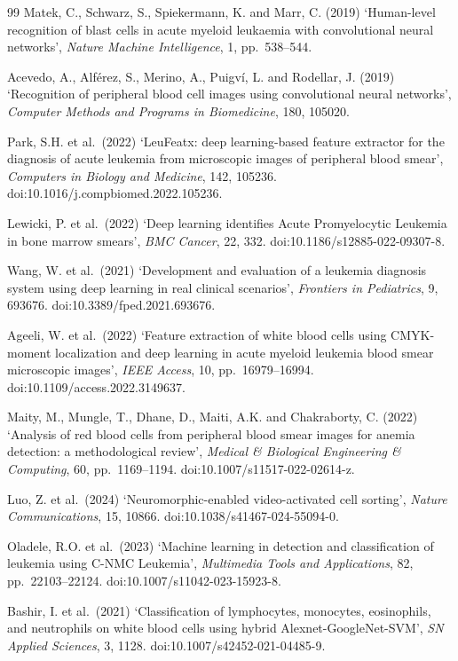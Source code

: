 \documentclass[11pt]{article}
\begin{document}
\begin{thebibliography}{99}
Matek, C., Schwarz, S., Spiekermann, K. and Marr, C. (2019)
`Human-level recognition of blast cells in acute myeloid leukaemia with
convolutional neural networks', \emph{Nature Machine Intelligence}, 1,
pp.\ 538--544.

Acevedo, A., Alf\'erez, S., Merino, A., Puigv\'i, L. and Rodellar, J. (2019)
`Recognition of peripheral blood cell images using convolutional neural
networks', \emph{Computer Methods and Programs in Biomedicine}, 180, 105020.

Park, S.H. et al.\ (2022)
`LeuFeatx: deep learning-based feature extractor for the diagnosis of acute
leukemia from microscopic images of peripheral blood smear',
\emph{Computers in Biology and Medicine}, 142, 105236.
doi:10.1016/j.compbiomed.2022.105236.

Lewicki, P. et al.\ (2022)
`Deep learning identifies Acute Promyelocytic Leukemia in bone marrow smears',
\emph{BMC Cancer}, 22, 332. doi:10.1186/s12885-022-09307-8.

Wang, W. et al.\ (2021)
`Development and evaluation of a leukemia diagnosis system using deep learning
in real clinical scenarios', \emph{Frontiers in Pediatrics}, 9, 693676.
doi:10.3389/fped.2021.693676.

Ageeli, W. et al.\ (2022)
`Feature extraction of white blood cells using CMYK-moment localization and
deep learning in acute myeloid leukemia blood smear microscopic images',
\emph{IEEE Access}, 10, pp.\ 16979--16994. doi:10.1109/access.2022.3149637.

Maity, M., Mungle, T., Dhane, D., Maiti, A.K. and Chakraborty, C. (2022)
`Analysis of red blood cells from peripheral blood smear images for anemia
detection: a methodological review',
\emph{Medical \& Biological Engineering \& Computing}, 60, pp.\ 1169--1194.
doi:10.1007/s11517-022-02614-z.

Luo, Z. et al.\ (2024)
`Neuromorphic-enabled video-activated cell sorting',
\emph{Nature Communications}, 15, 10866. doi:10.1038/s41467-024-55094-0.

Oladele, R.O. et al.\ (2023)
`Machine learning in detection and classification of leukemia using C-NMC
Leukemia', \emph{Multimedia Tools and Applications}, 82, pp.\ 22103--22124.
doi:10.1007/s11042-023-15923-8.

Bashir, I. et al.\ (2021)
`Classification of lymphocytes, monocytes, eosinophils, and neutrophils on
white blood cells using hybrid Alexnet-GoogleNet-SVM',
\emph{SN Applied Sciences}, 3, 1128. doi:10.1007/s42452-021-04485-9.

\end{thebibliography}
\end{document}
